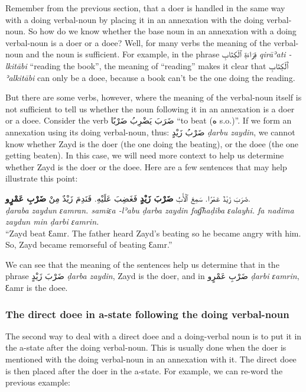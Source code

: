 \documentclass[
  10pt,
]{book}
\begin{document}
Remember from the previous section, that a doer is handled in the same way with a doing verbal-noun by placing it in an annexation with the doing verbal-noun. So how do we know whether the base noun in an annexation with a doing verbal-noun is a doer or a doee? Well, for many verbs the meaning of the verbal-noun and the noun is sufficient. For example, in the phrase \foreignlanguage{arabic}{قِرَاءَةِ ٱلْکِتَابِ} \emph{qirāʾati -lkitābi} \enquote{reading the book}, the meaning of \enquote{reading} makes it clear that \foreignlanguage{arabic}{ٱَلْکِتَابِ} \emph{ʾalkitābi} can only be a doee, because a book can't be the one doing the reading.

But there are some verbs, however, where the meaning of the verbal-noun itself is not sufficient to tell us whether the noun following it in an annexation is a doer or a doee. Consider the verb
\foreignlanguage{arabic}{ضَرَبَ يَضْرِبُ ضَرْبًا} \enquote{to beat (\foreignlanguage{arabic}{ه} s.o.)}. If we form an annexation using its doing verbal-noun, thus: \foreignlanguage{arabic}{ضَرْبُ زَيْدٍ} \emph{ḍarbu zaydin}, we cannot know whether Zayd is the doer (the one doing the beating), or the doee (the one getting beaten). In this case, we will need more context to help us determine whether Zayd is the doer or the doee. Here are a few sentences that may help illustrate this point:

\foreignlanguage{arabic}{ضَرَبَ زَيْدٌ عَمْرًا. سَمِعَ ٱلْأَبُ \textbf{ضَرْبَ زَيْدٍ} فَغَضِبَ عَلَيْهِ. فَنَدِمَ زَيْدٌ مِنْ \textbf{ضَرْبِ عَمْرٍو}.}\\
\emph{ḍaraba zaydun ɛamran. samiɛa -lʾabu ḍarba zaydin fag͡haḍiba ɛalayhi. fa nadima zaydun min ḍarbi ɛamrin.}\\
\enquote{Zayd beat Ɛamr. The father heard Zayd's beating so he became angry with him. So, Zayd became remorseful of beating Ɛamr.}

We can see that the meaning of the sentences help us determine that in the phrase
\foreignlanguage{arabic}{ضَرْبَ زَيْدٍ}
\emph{ḍarba zaydin}, Zayd is the doer, and in
\foreignlanguage{arabic}{ضَرْبِ عَمْرٍو}
\emph{ḍarbi ɛamrin}, Ɛamr is the doee.

\subsubsection{The direct doee in a-state following the doing verbal-noun}\label{the-direct-doee-in-a-state-following-the-doing-verbal-noun}

The second way to deal with a direct doee and a doing-verbal noun is to put it in the a-state after the doing verbal-noun. This is usually done when the doer is mentioned with the doing verbal-noun in an annexation with it. The direct doee is then placed after the doer in the a-state. For example, we can re-word the previous example:
\end{document}
